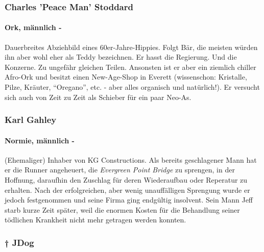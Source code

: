     
    
    
    \subsubsection{Charles 'Peace Man' Stoddard}
    \paragraph{Ork, männlich -} Dauerbreites Abziehbild eines 60er-Jahre-Hippies. Folgt Bär, die meisten würden ihn aber wohl eher als Teddy bezeichnen. Er hasst die Regierung. Und die Konzerne. Zu ungefähr gleichen Teilen. Ansonsten ist er aber ein ziemlich chiller Afro-Ork und besitzt einen New-Age-Shop in Everett (wissenschon: Kristalle, Pilze, Kräuter, ``Oregano'', etc. - aber alles organisch und natürlich!). Er versucht sich auch von Zeit zu Zeit als Schieber für ein paar Neo-As.
    
    \subsubsection{Karl Gahley}
    \paragraph{Normie, männlich -} (Ehemaliger) Inhaber von KG Constructions. Als bereits geschlagener Mann hat er die Runner angeheuert, die \textit{Evergreen Point Bridge} zu sprengen, in der Hoffnung, daraufhin den Zuschlag für deren Wiederaufbau oder Reperatur zu erhalten. Nach der erfolgreichen, aber wenig unauffälligen Sprengung wurde er jedoch festgenommen und seine Firma ging endgültig insolvent. Sein Mann Jeff starb kurze Zeit später, weil die enormen Kosten für die Behandlung seiner tödlichen Krankheit nicht mehr getragen werden konnten.
    
    
    \subsubsection{\textsf{†} JDog}
